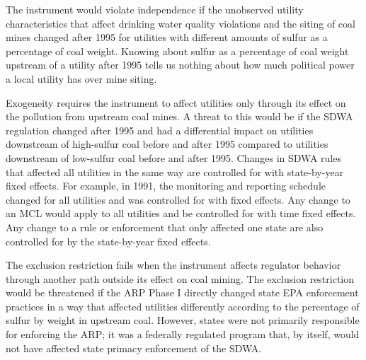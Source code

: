 \documentclass[12pt]{article}
\begin{document}
The instrument would violate independence if the unobserved utility characteristics that affect drinking water quality violations and the siting of coal mines changed after 1995 for utilities with different amounts of sulfur as a percentage of coal weight. Knowing about sulfur as a percentage of coal weight upstream of a utility after 1995 tells us nothing about how much political power a local utility has over mine siting.

Exogeneity requires the instrument to affect utilities only through its effect on the pollution from upstream coal mines. A threat to this would be if the SDWA regulation changed after 1995 and had a differential impact on utilities downstream of high-sulfur coal before and after 1995 compared to utilities downstream of low-sulfur coal before and after 1995. Changes in SDWA rules that affected all utilities in the same way are controlled for with state-by-year fixed effects. For example, in 1991, the monitoring and reporting schedule changed for all utilities and was controlled for with fixed effects. Any change to an MCL would apply to all utilities and be controlled for with time fixed effects. Any change to a rule or enforcement that only affected one state are also controlled for by the state-by-year fixed effects.


The exclusion restriction fails when the instrument affects regulator behavior through another path outside its effect on coal mining. The exclusion restriction would be threatened if the ARP Phase I directly changed state EPA enforcement practices in a way that affected utilities differently according to the percentage of sulfur by weight in upstream coal. However, states were not primarily responsible for enforcing the ARP; it was a federally regulated program that, by itself, would not have affected state primacy enforcement of the SDWA. 
\end{document}

